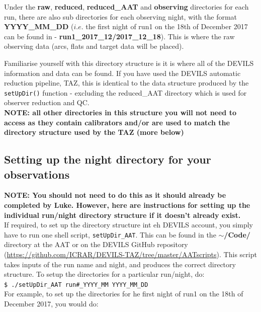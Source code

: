 \documentclass[12pt]{article}
\begin{document}
Under the \textbf{raw}, \textbf{reduced}, \textbf{reduced\_AAT} and \textbf{observing} directories for each run, there are also sub directories for each observing night, with the format \textbf{YYYY\_MM\_DD} ($i.e.$ the first night of run1 on the 18th of December 2017 can be found in - \textbf{run1\_2017\_12/2017\_12\_18}). This is where the raw observing data (arcs, flats and target data will be placed).

Familiarise yourself with this directory structure is it is where all of the DEVILS information and data can be found. If you have used the DEVILS automatic reduction pipeline, TAZ, this is identical to the data structure produced by the \texttt{setUpDir()} function - excluding the reduced\_AAT directory which is used for observer reduction and QC. \\

\textcolor{PineGreen}{\textbf{NOTE: all other directories in this structure you will not need to access as they contain calibrators and/or are used to match the directory structure used by the TAZ (more below)}}\\


\subsection{Setting up the night directory for your observations}

\textcolor{PineGreen}{\textbf{NOTE: You should not need to do this as it should already be completed by Luke. However, here are instructions for setting up the individual run/night directory structure if it doesn't already exist.}} \\

If required, to set up the directory structure int eh DEVILS account, you simply have to run one shell script, \texttt{setUpDir\_AAT}. This can be found in the \textbf{$\sim$/Code/} directory at the AAT or on the DEVILS GitHub repository (\url{https://github.com/ICRAR/DEVILS-TAZ/tree/master/AATscripts}). This script  takes inputs of the run name and night, and produces the correct directory structure. To setup the directories for a particular run/night, do:\\

\hspace{10mm} \texttt{\$ ./setUpDir\_AAT run\#\_YYYY\_MM YYYY\_MM\_DD} \\

For example, to set up the directories for he first night of run1 on the 18th of December 2017, you would do: \\
\end{document}
